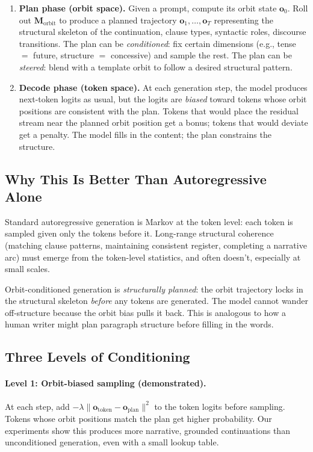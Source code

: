 \documentclass[11pt, a4paper]{article}
\newcommand{\M}{\mathbf{M}}
\newcommand{\orbit}{\mathbf{o}}
\theoremstyle{plain}
\theoremstyle{definition}
\theoremstyle{remark}
\begin{document}
\begin{enumerate}[leftmargin=*]
\item \textbf{Plan phase (orbit space).}
    Given a prompt, compute its orbit state $\orbit_0$.
    Roll out $\M_{\text{orbit}}$ to produce a planned trajectory $\orbit_1, \ldots, \orbit_T$ representing the structural skeleton of the continuation, clause types, syntactic roles, discourse transitions.
    The plan can be \emph{conditioned}: fix certain dimensions (e.g., tense $=$ future, structure $=$ concessive) and sample the rest.
    The plan can be \emph{steered}: blend with a template orbit to follow a desired structural pattern.

\item \textbf{Decode phase (token space).}
    At each generation step, the model produces next-token logits as usual, but the logits are \emph{biased} toward tokens whose orbit positions are consistent with the plan.
    Tokens that would place the residual stream near the planned orbit position get a bonus; tokens that would deviate get a penalty.
    The model fills in the content; the plan constrains the structure.
\end{enumerate}

\subsection{Why This Is Better Than Autoregressive Alone}

Standard autoregressive generation is Markov at the token level: each token is sampled given only the tokens before it.
Long-range structural coherence (matching clause patterns, maintaining consistent register, completing a narrative arc) must emerge from the token-level statistics, and often doesn't, especially at small scales.

Orbit-conditioned generation is \emph{structurally planned}: the orbit trajectory locks in the structural skeleton \emph{before} any tokens are generated.
The model cannot wander off-structure because the orbit bias pulls it back.
This is analogous to how a human writer might plan paragraph structure before filling in the words.

\subsection{Three Levels of Conditioning}

\paragraph{Level 1: Orbit-biased sampling (demonstrated).}
At each step, add $-\lambda \|\orbit_{\text{token}} - \orbit_{\text{plan}}\|^2$ to the token logits before sampling.
Tokens whose orbit positions match the plan get higher probability.
Our experiments show this produces more narrative, grounded continuations than unconditioned generation, even with a small lookup table.
\end{document}
